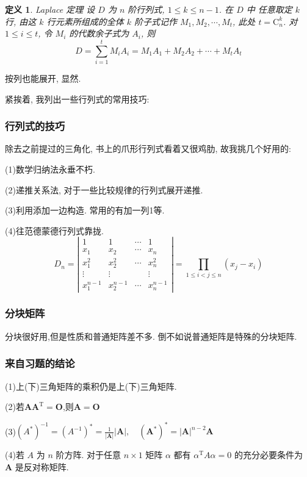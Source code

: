 \documentclass{article}
\newtheorem{mydef}{定义}
\begin{document}
\begin{mydef}{Laplace 定理}
	设 $D$ 为 $n$ 阶行列式, $1 \leq k \leq n-1$. 在 $D$ 中 任意取定 $k$ 行, 由这 $k$ 行元素所组成的全体 $k$ 阶子式记作 $M_{1}, M_{2}, \cdots, M_{t}$, 此处 $t=\mathrm{C}_{n}^{k}$. 对 $1 \leq i \leq t$, 令 $M_{i}$ 的代数余子式为 $A_{i}$, 则
	$$
	D=\sum_{i=1}^{t} M_{i} A_{i}=M_{1} A_{1}+M_{2} A_{2}+\cdots+M_{t} A_{t}
	$$
\end{mydef}
按列也能展开, 显然.

紧挨着, 我列出一些行列式的常用技巧:
\subsubsection{行列式的技巧}
除去之前提过的三角化, 书上的爪形行列式看着又很鸡肋, 故我挑几个好用的:

(1)数学归纳法永垂不朽.

(2)递推关系法, 对于一些比较规律的行列式展开递推.

(3)利用添加一边构造. 常用的有加一列1等.

(4)往范德蒙德行列式靠拢.
$$
D_{n}=\left|\begin{array}{cccc}
	1 & 1 & \cdots & 1 \\
	x_{1} & x_{2} & \cdots & x_{n} \\
	x_{1}^{2} & x_{2}^{2} & \cdots & x_{n}^{2} \\
	\vdots & \vdots & & \vdots \\
	x_{1}^{n-1} & x_{2}^{n-1} & \cdots & x_{n}^{n-1}
\end{array}\right|=\prod_{1 \leq i<j \leq n}\left(x_{j}-x_{i}\right)
$$
\subsubsection{分块矩阵}
分块很好用,但是性质和普通矩阵差不多. 倒不如说普通矩阵是特殊的分块矩阵.
\subsubsection{来自习题的结论}
(1)上(下)三角矩阵的乘积仍是上(下)三角矩阵.

(2)若$\boldsymbol{A}\boldsymbol{A}^{\mathrm{T}}=\boldsymbol{O}$,则$\boldsymbol{A}=\boldsymbol{O}$

(3)$\left(A^{*}\right)^{-1}=\left(A^{-1}\right)^{*}=\frac{1}{|\boldsymbol{A}|}|\boldsymbol{A}|, \quad\left(\boldsymbol{A}^{*}\right)^{*}=|\boldsymbol{A}|^{n-2} \boldsymbol{A}$

(4)若 $A$ 为 $n$ 阶方阵. 对于任意 $n \times 1$ 矩阵 $\alpha$ 都有 $\alpha^{\mathrm{T}} A \alpha=0$ 的充分必要条件为 $\boldsymbol{A}$ 是反对称矩阵.
\end{document}
